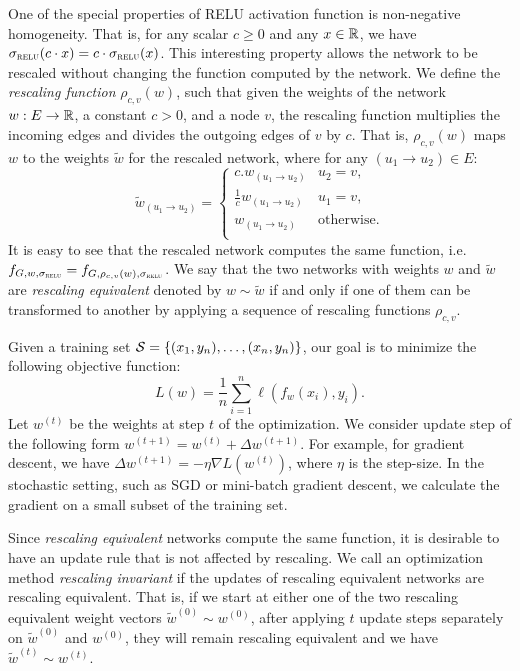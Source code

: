 \documentclass[11pt]{article}
\newcommand{\relu}{\sigma_{\textsc{relu}}}
\begin{document}
One of the special properties of RELU activation function is non-negative homogeneity. That is, for any scalar $c\geq 0$ and any $x\in \mathbb{R}$, we have $\relu(c\cdot x)=c\cdot \relu(x)$. This  interesting property allows the network to be rescaled without changing the function computed by the network. We define the {\em rescaling function} $\rho_{c,v}(w)$, such that given the weights of the network $w:E\rightarrow \mathbb{R}$, a constant $c>0$, and a node $v$, the rescaling function multiplies the incoming edges and divides the outgoing edges of $v$ by $c$. That is, $\rho_{c,v}(w)$ maps $w$ to the weights $\tilde{w}$ for the rescaled network, where for any $(u_1\rightarrow u_2)\in E$:
\begin{equation}
\tilde{w}_{(u_1\rightarrow u_2)}=
\begin{cases}
c.w_{(u_1\rightarrow u_2)}& u_2=v,\\
\frac{1}{c}w_{(u_1\rightarrow u_2)}& u_1=v,\\
w_{(u_1\rightarrow u_2)}& \text{otherwise.}\\
\end{cases}
\end{equation}
It is easy to see that the rescaled network computes the same function, i.e. $f_{G,w,\relu} =f_{G,\rho_{c,v}(w),\relu}$. We say that the two networks with weights $w$ and $\tilde{w}$ are {\em rescaling equivalent} denoted by $w\sim \tilde{w}$ if and only if one of them can be transformed to another by applying a sequence of rescaling functions $\rho_{c,v}$.

Given a training set $\mathcal{S} = \{(x_1,y_n),\dots, (x_n,y_n)\}$, our goal is to %
minimize the following objective function:
\begin{equation}
L(w) = \frac{1}{n}\sum_{i=1}^n \ell(f_w(x_i),y_i).
\end{equation}
Let $w^{(t)}$ be the weights at step $t$ of the optimization. We consider update step of the following form $w^{(t+1)} = w^{(t)} + \Delta w^{(t+1)}$. For example, for gradient descent, we have  $\Delta w^{(t+1)} = -\eta\nabla L(w^{(t)})$, where $\eta$ is the step-size. In the stochastic setting, such as SGD or mini-batch gradient descent, we calculate the gradient on a small subset of the training set. 

Since {\em rescaling equivalent} networks compute the same function,
it is desirable to have an update rule that is not affected by
rescaling. We call an optimization method {\em rescaling invariant} if
the updates of rescaling equivalent networks are rescaling equivalent.
That is, if we start at either one of the two rescaling equivalent
weight vectors $\tilde{w}^{(0)}\sim w^{(0)}$, after applying $t$
update steps separately on $\tilde{w}^{(0)}$ and $w^{(0)}$, they will
remain rescaling equivalent and we have $\tilde{w}^{(t)} \sim
w^{(t)}$.
\end{document}
